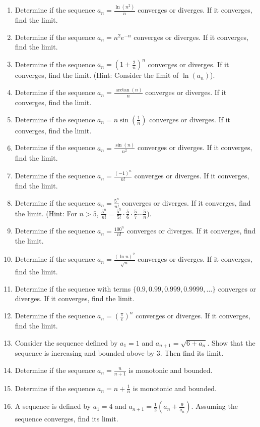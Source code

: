 \documentclass{article}
\begin{document}
\begin{enumerate}
    \item Determine if the sequence $a_n = \frac{\ln(n^2)}{n}$ converges or diverges. If it converges, find the limit.
    \item Determine if the sequence $a_n = n^2 e^{-n}$ converges or diverges. If it converges, find the limit.
    \item Determine if the sequence $a_n = (1 + \frac{2}{n})^n$ converges or diverges. If it converges, find the limit. (Hint: Consider the limit of $\ln(a_n)$).
    \item Determine if the sequence $a_n = \frac{\arctan(n)}{n}$ converges or diverges. If it converges, find the limit.
    \item Determine if the sequence $a_n = n \sin(\frac{1}{n})$ converges or diverges. If it converges, find the limit.

    \item Determine if the sequence $a_n = \frac{\sin(n)}{n^2}$ converges or diverges. If it converges, find the limit.
    \item Determine if the sequence $a_n = \frac{(-1)^n}{n!}$ converges or diverges. If it converges, find the limit.
    \item Determine if the sequence $a_n = \frac{5^n}{n!}$ converges or diverges. If it converges, find the limit. (Hint: For $n > 5$, $\frac{5^n}{n!} = \frac{5^5}{5!} \cdot \frac{5}{6} \cdot \frac{5}{7} \cdots \frac{5}{n}$).

    \item Determine if the sequence $a_n = \frac{100^n}{n!}$ converges or diverges. If it converges, find the limit.
    \item Determine if the sequence $a_n = \frac{(\ln n)^2}{\sqrt{n}}$ converges or diverges. If it converges, find the limit.
    \item Determine if the sequence with terms $\{0.9, 0.99, 0.999, 0.9999, \dots\}$ converges or diverges. If it converges, find the limit.
    \item Determine if the sequence $a_n = (\frac{\pi}{e})^n$ converges or diverges. If it converges, find the limit.

    \item Consider the sequence defined by $a_1 = 1$ and $a_{n+1} = \sqrt{6 + a_n}$. Show that the sequence is increasing and bounded above by 3. Then find its limit.
    \item Determine if the sequence $a_n = \frac{n}{n+1}$ is monotonic and bounded.
    \item Determine if the sequence $a_n = n + \frac{1}{n}$ is monotonic and bounded.
    \item A sequence is defined by $a_1 = 4$ and $a_{n+1} = \frac{1}{2}(a_n + \frac{9}{a_n})$. Assuming the sequence converges, find its limit.


\end{enumerate}
\end{document}
